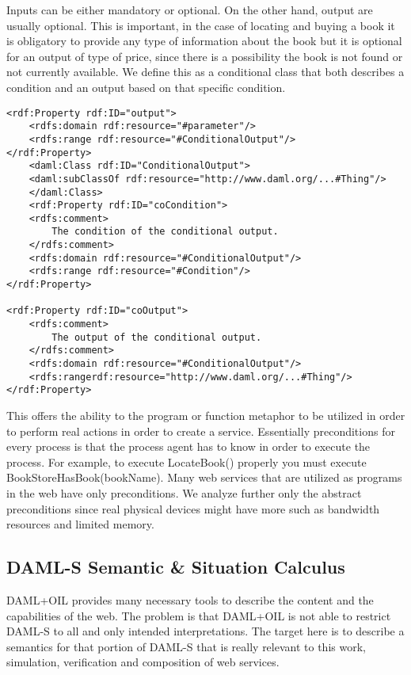 Inputs can be either mandatory or optional. On the other hand, output are usually optional. This is important, in the case of locating and buying a book it is obligatory to provide any type of information about the book but it is optional for an output of type of price, since there is a possibility the book is not found or not currently available. We define this as a conditional class that both describes a condition and an output based on that specific condition.

\begin{lstlisting}
<rdf:Property rdf:ID="output">
    <rdfs:domain rdf:resource="#parameter"/>
    <rdfs:range rdf:resource="#ConditionalOutput"/>
</rdf:Property>
    <daml:Class rdf:ID="ConditionalOutput">
    <daml:subClassOf rdf:resource="http://www.daml.org/...#Thing"/>
    </daml:Class>
    <rdf:Property rdf:ID="coCondition">
    <rdfs:comment>
        The condition of the conditional output.
    </rdfs:comment>
    <rdfs:domain rdf:resource="#ConditionalOutput"/>
    <rdfs:range rdf:resource="#Condition"/>
</rdf:Property>

<rdf:Property rdf:ID="coOutput">
    <rdfs:comment>
        The output of the conditional output.
    </rdfs:comment>
    <rdfs:domain rdf:resource="#ConditionalOutput"/>
    <rdfs:rangerdf:resource="http://www.daml.org/...#Thing"/>
</rdf:Property>
\end{lstlisting}

This offers the ability to the program or function metaphor to be utilized in order to perform real actions in order to create a service. Essentially preconditions for every process is that the process agent has to know in order to execute the process. For example, to execute LocateBook() properly you must execute BookStoreHasBook(bookName). Many web services that are utilized as programs in the web have only preconditions. We analyze further only the abstract preconditions since real physical devices might have more such as bandwidth resources and limited memory.

\subsection*{DAML-S Semantic \& Situation Calculus}

DAML+OIL provides many necessary tools to describe the content and the capabilities of the web. The problem is that DAML+OIL is not able to restrict DAML-S to all and only intended interpretations. The target here is to describe a semantics for that portion of DAML-S that is really relevant to this work, simulation, verification and composition of web services.

